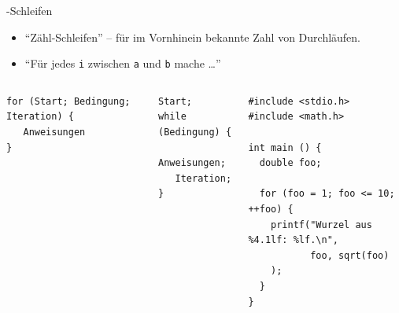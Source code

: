 \begin{frame}[fragile]{-Schleifen}
%
\begin{itemize}
\item \enquote{Zähl-Schleifen} -- für im Vornhinein bekannte Zahl von Durchläufen.
\item \enquote{Für jedes \texttt{i} zwischen \texttt{a} und \texttt{b} mache \ldots}
\end{itemize}
\vspace{-5pt}
%
\begin{columns}[T]
\begin{codebox}[Syntax]
\begin{verbatim}
for (Start; Bedingung; Iteration) {
   Anweisungen
}
\end{verbatim}
\end{codebox}
%
\begin{codebox}[Umsetzung]
\begin{verbatim}
Start;
while (Bedingung) {
   Anweisungen;
   Iteration;
}
\end{verbatim}
\end{codebox}
%
\begin{codebox}
\begin{verbatim}
#include <stdio.h>
#include <math.h>

int main () {
  double foo;
  
  for (foo = 1; foo <= 10; ++foo) {
    printf("Wurzel aus %4.1lf: %lf.\n", 
           foo, sqrt(foo)
    );
  }
}
\end{verbatim}
\end{codebox}
\end{columns}
%
\end{frame}


